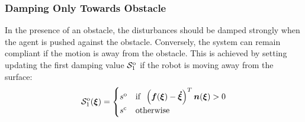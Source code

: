 \subsubsection{Damping Only Towards Obstacle} \label{sec:damping_only_toward}
In the presence of an obstacle, the disturbances should be damped strongly when the agent is pushed against the obstacle. Conversely, the system can remain compliant if the motion is away from the obstacle. This is achieved by setting updating the first damping value $\mathcal{S}^{\mathrm{o}}_1$ if the robot is moving away from the surface:
\begin{equation}
  \matd{S}_1^{\mathrm{o}} (\vecs \xi) =
  \begin{cases}
    s^{\mathrm{o}} & \text{if} \;\; \left(\vect f(\vecs \xi) - \vecs{\dot \xi} \right)^T \vecs n(\vect \xi) > 0 \\
    s^{\mathrm{c}} & \text{otherwise}
  \end{cases}
  \label{eq:leaving_compliance}
\end{equation}


